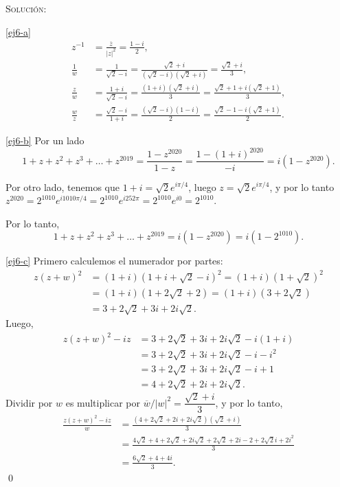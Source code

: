 \documentclass[a4paper,12pt,twoside,spanish,reqno]{amsbook}
\numberwithin{equation}{section}
\newcommand{\rta}{\noindent\textsc{Solución: }}
\begin{document}
\begin{enumerate}[topsep=6pt, itemsep=.4cm]
\rta

\ref{ej6-a} 
\begin{align*}
    z^{-1} &= \frac{\overline{z}}{|z|^2} = \frac{1-i}{2}, \\
    \frac{1}{w} &= \frac{1}{\sqrt{2}-i}= \frac{\sqrt{2}+i}{(\sqrt{2}-i)(\sqrt{2}+i)} = \frac{\sqrt{2}+i}{3}, \\
    \frac{z}{w} &= \frac{1+i}{\sqrt{2}-i} = \frac{(1+i)(\sqrt{2}+i)}{3} = \frac{\sqrt{2}+1+i(\sqrt{2}+1)}{3}, \\
    \frac{w}{z} &= \frac{\sqrt{2}-i}{1+i} = \frac{(\sqrt{2}-i)(1-i)}{2} = \frac{\sqrt{2}-1-i(\sqrt{2}+1)}{2}.
\end{align*}

\ref{ej6-b} 
Por un lado 
\begin{equation*}
    1+z+z^2+z^3+\dots+z^{2019} = \frac{1-z^{2020}}{1-z} = \frac{1-(1+i)^{2020}}{-i} =i(1-z^{2020}). 
\end{equation*}

Por otro lado, tenemos que $1+ i = \sqrt{2} e^{i \pi/4}$, luego $z = \sqrt{2} e^{i \pi/4}$, y por lo tanto $z^{2020} = 2^{1010} e^{i 1010 \pi/4} = 2^{1010} e^{i 252 \pi} = 2^{1010} e^{i 0} = 2^{1010}$.

Por lo tanto,
$$
1+z+z^2+z^3+\dots+z^{2019} = i(1-z^{2020}) = i(1- 2^{1010}).
$$

\ref{ej6-c} Primero calculemos el numerador por partes:
\begin{align*}
    z(z+w)^2 &= (1+i)(1+i + \sqrt{2}-i)^2 = (1+i)(1+\sqrt{2})^2 \\
    &= (1+i)(1+2\sqrt{2} + 2) = (1+i)(3+2\sqrt{2}) \\
    &= 3+2\sqrt{2} + 3i + 2i\sqrt{2}.
\end{align*}
Luego, 
\begin{align*}
    z(z+w)^2-iz &= 3+2\sqrt{2} + 3i + 2i\sqrt{2} -i(1+i) \\
    &= 3+2\sqrt{2} + 3i + 2i\sqrt{2} -i -i^2 \\
    &= 3+2\sqrt{2} + 3i + 2i\sqrt{2} -i +1 \\
    &= 4+2\sqrt{2} + 2i + 2i\sqrt{2}.
\end{align*}
Dividir por $w$ es multiplicar por $\overline{w}/|w|^2 = \dfrac{\sqrt{2} +i}{3}$, y por lo tanto,
\begin{align*}
    \frac{z(z+w)^2-iz}{w} &= \frac{(4+2\sqrt{2} + 2i + 2i\sqrt{2})(\sqrt{2} +i)}{3} \\
    &= \frac{4\sqrt{2} + 4 + 2\sqrt{2} + 2i\sqrt{2} + 2\sqrt{2} + 2i - 2 + 2\sqrt{2}i + 2i^2}{3} \\
    &= \frac{6\sqrt{2} + 4 + 4i}{3}.
\end{align*}
\qed



\end{enumerate}
\end{document}
